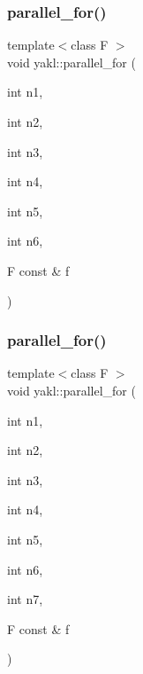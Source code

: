 \subsubsection{\texorpdfstring{parallel\+\_\+for()}{parallel\_for()}\hspace{0.1cm}{\footnotesize\ttfamily [6/16]}}
{\footnotesize\ttfamily template$<$class F $>$ \\
void yakl\+::parallel\+\_\+for (\begin{DoxyParamCaption}\item[{int}]{n1,  }\item[{int}]{n2,  }\item[{int}]{n3,  }\item[{int}]{n4,  }\item[{int}]{n5,  }\item[{int}]{n6,  }\item[{F const \&}]{f }\end{DoxyParamCaption})\hspace{0.3cm}{\ttfamily [inline]}}

\mbox{\label{namespaceyakl_a02a1ee8a10a92728d6d9a39a1aa5e2ff}} 
\subsubsection{\texorpdfstring{parallel\+\_\+for()}{parallel\_for()}\hspace{0.1cm}{\footnotesize\ttfamily [7/16]}}
{\footnotesize\ttfamily template$<$class F $>$ \\
void yakl\+::parallel\+\_\+for (\begin{DoxyParamCaption}\item[{int}]{n1,  }\item[{int}]{n2,  }\item[{int}]{n3,  }\item[{int}]{n4,  }\item[{int}]{n5,  }\item[{int}]{n6,  }\item[{int}]{n7,  }\item[{F const \&}]{f }\end{DoxyParamCaption})\hspace{0.3cm}{\ttfamily [inline]}}

\mbox{\label{namespaceyakl_a8fb891e89ae5a57cc11fb82a7b327025}} 
